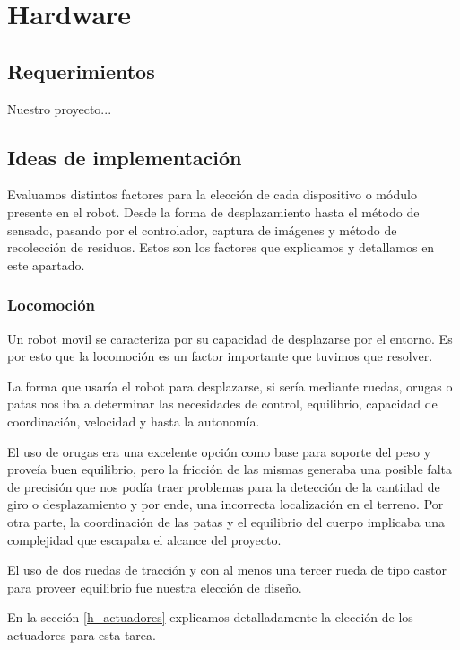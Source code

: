 \section{Hardware}
\label{h_hardware}

\subsection{Requerimientos}
\label{h_requerimientos}

Nuestro proyecto...


\subsection{Ideas de implementaci\'on}
\label{h_ideas}

Evaluamos distintos factores para la elecci\'on de cada dispositivo o m\'odulo presente en el robot.
Desde la forma de desplazamiento hasta el m\'etodo de sensado, pasando por el controlador, captura
de im\'agenes y m\'etodo de recolecci\'on de residuos.
Estos son los factores que explicamos y detallamos en este apartado.

\subsubsection{Locomoci\'on}
\label{h_ideas_locomocion}

Un robot movil se caracteriza por su capacidad de desplazarse por el entorno.
Es por esto que la locomoci\'on es un factor importante que tuvimos que resolver.

La forma que usar\'ia el robot para desplazarse, si ser\'ia mediante ruedas, orugas o patas nos
iba a determinar las necesidades de control, equilibrio, capacidad de coordinaci\'on, velocidad
y hasta la autonom\'ia.

El uso de orugas era una excelente opci\'on como base para soporte del peso y prove\'ia buen
equilibrio, pero la fricci\'on de las mismas generaba una posible falta de precisi\'on que nos
pod\'ia traer problemas para la detecci\'on de la cantidad de giro o desplazamiento y por ende,
una incorrecta localizaci\'on en el terreno.
Por otra parte, la coordinaci\'on de las patas y el equilibrio del cuerpo implicaba una
complejidad que escapaba el alcance del proyecto.

El uso de dos ruedas de tracci\'on y con al menos una tercer rueda de tipo castor para proveer
equilibrio fue nuestra elecci\'on de dise\~no.

En la secci\'on \ref{h_actuadores} explicamos detalladamente la elecci\'on de los actuadores
para esta tarea.

